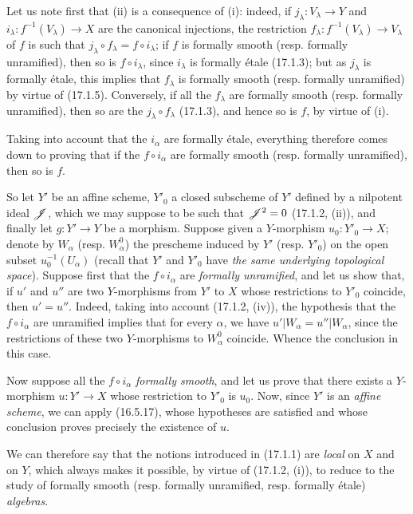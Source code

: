Let us note first that (ii) is a consequence of (i): indeed, if $j_\lambda:V_\lambda\to Y$ and $i_\lambda:f^{-1}(V_\lambda)\to X$ are the canonical injections, the restriction $f_\lambda:f^{-1}(V_\lambda)\to V_\lambda$ of $f$ is such that $j_\lambda\circ f_\lambda=f\circ i_\lambda$; if $f$ is formally smooth (resp. formally unramified), then so is $f\circ i_\lambda$, since $i_\lambda$ is formally étale (17.1.3); but as $j_\lambda$ is formally étale, this implies that $f_\lambda$ is formally smooth (resp. formally unramified) by virtue of (17.1.5). Conversely, if all the $f_\lambda$ are formally smooth (resp. formally unramified), then so are the $j_\lambda\circ f_\lambda$ (17.1.3), and hence so is $f$, by virtue of (i).

Taking into account that the $i_\alpha$ are formally étale, everything therefore comes down to proving that if the $f\circ i_\alpha$ are formally smooth (resp. formally unramified), then so is $f$.

So let $Y'$ be an affine scheme, $Y'_0$ a closed subscheme of $Y'$ defined by a nilpotent ideal $\mathscr{J}$, which we may suppose to be such that $\mathscr{J}^2=0$ (17.1.2, (ii)), and finally let $g:Y'\to Y$ be a morphism. Suppose given a $Y$-morphism $u_0:Y'_0\to X$; denote by $W_\alpha$ (resp. $W^0_\alpha$) the prescheme induced by $Y'$ (resp. $Y'_0$) on the open subset $u_0^{-1}(U_\alpha)$ (recall that $Y'$ and $Y'_0$ have \emph{the same underlying topological space}). Suppose first that the $f\circ i_\alpha$ are \emph{formally unramified}, and let us show that, if $u'$ and $u''$ are two $Y$-morphisms from $Y'$ to $X$ whose restrictions to $Y'_0$ coincide, then $u'=u''$. Indeed, taking into account (17.1.2, (iv)), the hypothesis that the $f\circ i_\alpha$ are unramified implies that for every $\alpha$, we have $u'|W_\alpha=u''|W_\alpha$, since the restrictions of these two $Y$-morphisms to $W^0_\alpha$ coincide. Whence the conclusion in this case.

Now suppose all the $f\circ i_\alpha$ \emph{formally smooth}, and let us prove that there exists a $Y$-morphism $u:Y'\to X$ whose restriction to $Y'_0$ is $u_0$. Now, since $Y'$ is an \emph{affine scheme}, we can apply (16.5.17), whose hypotheses are satisfied and whose conclusion proves precisely the existence of $u$.

We can therefore say that the notions introduced in (17.1.1) are \emph{local} on $X$ and on $Y$, which always makes it possible, by virtue of (17.1.2, (i)), to reduce to the study of formally smooth (resp. formally unramified, resp. formally étale) \emph{algebras}.

